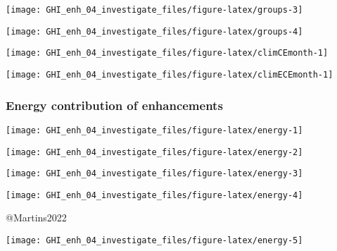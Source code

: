 \documentclass[
  10pt,
  a4paper,oneside]{article}
\begin{document}
\begin{center}\texttt{[image: GHI\_enh\_04\_investigate\_files/figure-latex/groups-3]} \end{center}

\begin{center}\texttt{[image: GHI\_enh\_04\_investigate\_files/figure-latex/groups-4]} \end{center}

\begin{center}\texttt{[image: GHI\_enh\_04\_investigate\_files/figure-latex/climCEmonth-1]} \end{center}

\begin{center}\texttt{[image: GHI\_enh\_04\_investigate\_files/figure-latex/climECEmonth-1]} \end{center}

\newpage
\FloatBarrier

\hypertarget{energy-contribution-of-enhancements}{%
\subsubsection{Energy contribution of enhancements}\label{energy-contribution-of-enhancements}}

\begin{center}\texttt{[image: GHI\_enh\_04\_investigate\_files/figure-latex/energy-1]} \end{center}

\begin{center}\texttt{[image: GHI\_enh\_04\_investigate\_files/figure-latex/energy-2]} \end{center}

\begin{center}\texttt{[image: GHI\_enh\_04\_investigate\_files/figure-latex/energy-3]} \end{center}

\begin{center}\texttt{[image: GHI\_enh\_04\_investigate\_files/figure-latex/energy-4]} \end{center}

@Martins2022

\begin{center}\texttt{[image: GHI\_enh\_04\_investigate\_files/figure-latex/energy-5]} \end{center}
\end{document}
